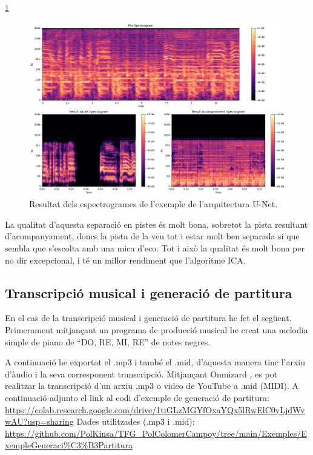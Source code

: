 \documentclass[10pt,a4paper,twocolumn,twoside]{article}
\begin{document}
\ref{fig:U-Net-exemple}
\begin{figure}[h]
    \centering
    \includegraphics[width=1\linewidth]{img/u-net_results/unet_example.png}
    \caption{Resultat dels espectrogrames de l'exemple de l'arquitectura U-Net.}
    \label{fig:U-Net-exemple}
\end{figure}

La qualitat d'aquesta separació en pistes és molt bona, sobretot la pista resultant d'acompanyament, doncs la pista de la veu tot i estar molt ben separada sí que sembla que s'escolta amb una mica d'eco.
Tot i això la qualitat és molt bona per no dir excepcional, i té un millor rendiment que l'algoritme ICA.

\subsection{Transcripció musical i generació de partitura}

En el cas de la transcripció musical i generació de partitura he fet el següent. Primerament mitjançant un programa de producció musical he creat una melodia simple de piano de ``DO, RE, MI, RE'' de notes negres.

A continuació he exportat el .mp3 i també el .mid, d'aquesta manera tinc l'arxiu d'àudio i la seva corresponent transcripció.
Mitjançant Omnizard \cite{Omnizard-Wu2021}, es pot realitzar la transcripció d'un arxiu .mp3 o video de YouTube a .mid (MIDI). 
A continuació adjunto el link al codi d'exemple de generació de partitura:
\url{https://colab.research.google.com/drive/1tiGLzMGYfOxaYQx5lRwElC0yLjdWvwAU?usp=sharing}
Dades utilitzades (.mp3 i .mid):
\url{https://github.com/PolKinsa/TFG_PolColomerCampoy/tree/main/Exemples/ExempleGeneraci%C3%B3Partitura}
\end{document}
